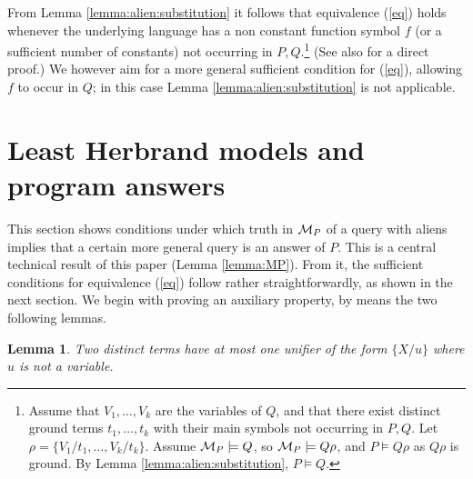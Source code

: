 \documentclass[a4paper]{tlp2}
\newtheorem{lemma}[theorem]{Lemma}
\newcommand*{\seq}[2][n]  {{#2_{1}, \allowbreak \ldots, \allowbreak #2_{#1}}}
\newcommand*{\M}{{\ensuremath{\cal M}}\xspace}
\begin{document}
From Lemma \ref{lemma:alien:substitution} it follows that equivalence (\ref{eq})
holds whenever the underlying language has a non constant function symbol $f$
(or a sufficient number of constants) not occurring in $P,Q$.\footnote{Assume that  $\seq[k]V$ are the variables of $Q$, and that there exist
    distinct ground terms $\seq[k]t$ with their main symbols
not occurring in $P,Q$.
    Let  $\rho=\{V_1/t_1,\ldots,V_k/t_k\}$.
Assume $\M_P\models Q$, so $\M_P\models Q\rho$, 
    and $P\models Q\rho$ as $Q\rho$ is ground.
By Lemma \ref{lemma:alien:substitution}, $P\models Q$. 
} (See also \cite[Appendix]{drabent.arxiv.coco14} for a direct proof.)
We however aim for a more general sufficient condition for (\ref{eq}),
allowing $f$ to occur in $Q$;
in this case Lemma \ref{lemma:alien:substitution} is not applicable.



\section{Least Herbrand models and program answers}
\label{sec:main}



This section shows conditions under which
truth in $\M_P$ of a query with aliens implies 
that a certain more general query is an answer of $P$.
This is a central technical result of this paper (Lemma \ref{lemma:MP}).  
From it,
the sufficient conditions for equivalence (\ref{eq}) follow rather
straightforwardly, as shown in the next section.
We begin with proving an auxiliary property, by means the two following lemmas.







\begin{lemma}
\label{lemma:unifier}
Two distinct terms have at most one unifier of the form $\{X/u\}$ where $u$
is not a variable.  
\end{lemma}
\end{document}

